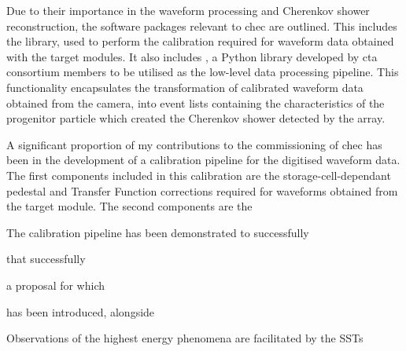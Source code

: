 Due to their importance in the waveform processing and Cherenkov shower reconstruction, the software packages relevant to \gls{chec} are outlined. This includes the  library, used to perform the calibration required for waveform data obtained with the \gls{target} modules. It also includes , a Python library developed by \gls{cta} consortium members to be utilised as the low-level data processing pipeline. This functionality encapsulates the transformation of calibrated waveform data obtained from the camera, into event lists containing the characteristics of the progenitor particle which created the Cherenkov shower detected by the array.

A significant proportion of my contributions to the commissioning of \gls{chec} has been in the development of a calibration pipeline for the digitised waveform data. The first components included in this calibration are the storage-cell-dependant pedestal and Transfer Function corrections required for waveforms obtained from the \gls{target} module. The second components are the 


 The calibration pipeline has been demonstrated to successfully 


that successfully 




 a proposal for which 

 has been introduced, alongside 




Observations of the highest energy phenomena are facilitated by the SSTs